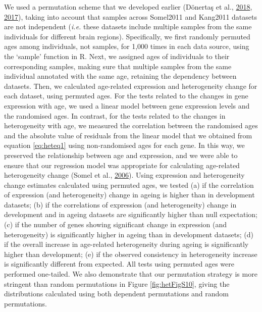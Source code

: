 \documentclass[12pt,twoside]{unicam}
\begin{document}
We used a permutation scheme that we developed earlier (Dönertaş et al., \protect\hyperlink{ref-Donertas2018}{2018}, \protect\hyperlink{ref-Donertas2017}{2017}), taking into account that samples across Somel2011 and Kang2011 datasets are not independent (\emph{i.e.} these datasets include multiple samples from the same individuals for different brain regions). Specifically, we first randomly permuted ages among individuals, not samples, for 1,000 times in each data source, using the `sample' function in R. Next, we assigned ages of individuals to their corresponding samples, making sure that multiple samples from the same individual annotated with the same age, retaining the dependency between datasets. Then, we calculated age-related expression and heterogeneity change for each dataset, using permuted ages. For the tests related to the changes in gene expression with age, we used a linear model between gene expression levels and the randomised ages. In contrast, for the tests related to the changes in heterogeneity with age, we measured the correlation between the randomised ages and the absolute value of residuals from the linear model that we obtained from equation \eqref{eq:heteq1} using non-randomised ages for each gene. In this way, we preserved the relationship between age and expression, and we were able to ensure that our regression model was appropriate for calculating age-related heterogeneity change (Somel et al., \protect\hyperlink{ref-Somel2006}{2006}). Using expression and heterogeneity change estimates calculated using permuted ages, we tested (a) if the correlation of expression (and heterogeneity) change in ageing is higher than in development datasets; (b) if the correlations of expression (and heterogeneity) change in development and in ageing datasets are significantly higher than null expectation; (c) if the number of genes showing significant change in expression (and heterogeneity) is significantly higher in ageing than in development datasets; (d) if the overall increase in age-related heterogeneity during ageing is significantly higher than development; (e) if the observed consistency in heterogeneity increase is significantly different from expected. All tests using permuted ages were performed one-tailed. We also demonstrate that our permutation strategy is more stringent than random permutations in Figure \ref{fig:hetFigS10}, giving the distributions calculated using both dependent permutations and random permutations.
\end{document}
